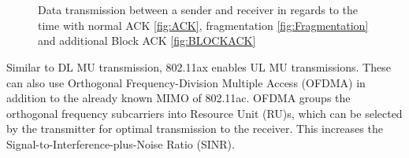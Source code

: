 \begin{figure}%
    \centering
    \\
    \\
    \caption{Data transmission between a sender and receiver in regards to the time with normal \acf{ACK} \autoref{fig:ACK},
    fragmentation \autoref{fig:Fragmentation} and additional Block \ac{ACK} \autoref{fig:BLOCKACK}}%
    \label{fig:ACKS}%
\end{figure}

Similar to
DL MU transmission, 802.11ax enables UL MU transmissions.
These can also use
Orthogonal Frequency-Division Multiple Access (OFDMA) in addition to the already
known MIMO of 802.11ac.
OFDMA groups the orthogonal frequency subcarriers
into Resource Unit (RU)s, which can be selected by the transmitter for optimal
transmission to the receiver.
This increases the Signal-to-Interference-plus-Noise
Ratio (SINR).

